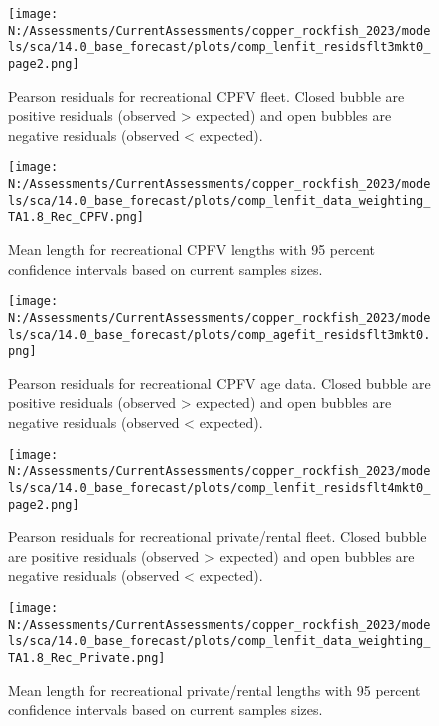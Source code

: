 \documentclass[11pt,
  english,
  letterpaper,
]{article}
\begin{document}
\pagebreak

\begin{figure}
\centering
\texttt{[image: N:/Assessments/CurrentAssessments/copper\_rockfish\_2023/models/sca/14.0\_base\_forecast/plots/comp\_lenfit\_residsflt3mkt0\_page2.png]}
\caption{Pearson residuals for recreational CPFV fleet. Closed bubble are positive residuals (observed \textgreater{} expected) and open bubbles are negative residuals (observed \textless{} expected).\label{fig:rec-cpfv-pearson}}
\end{figure}

\pagebreak

\begin{figure}
\centering
\texttt{[image: N:/Assessments/CurrentAssessments/copper\_rockfish\_2023/models/sca/14.0\_base\_forecast/plots/comp\_lenfit\_data\_weighting\_TA1.8\_Rec\_CPFV.png]}
\caption{Mean length for recreational CPFV lengths with 95 percent confidence intervals based on current samples sizes.\label{fig:rec-cpfv-mean-len-fit}}
\end{figure}

\pagebreak

\begin{figure}
\centering
\texttt{[image: N:/Assessments/CurrentAssessments/copper\_rockfish\_2023/models/sca/14.0\_base\_forecast/plots/comp\_agefit\_residsflt3mkt0.png]}
\caption{Pearson residuals for recreational CPFV age data. Closed bubble are positive residuals (observed \textgreater{} expected) and open bubbles are negative residuals (observed \textless{} expected).\label{fig:rec-cpfv-age-pearson}}
\end{figure}

\pagebreak

\begin{figure}
\centering
\texttt{[image: N:/Assessments/CurrentAssessments/copper\_rockfish\_2023/models/sca/14.0\_base\_forecast/plots/comp\_lenfit\_residsflt4mkt0\_page2.png]}
\caption{Pearson residuals for recreational private/rental fleet. Closed bubble are positive residuals (observed \textgreater{} expected) and open bubbles are negative residuals (observed \textless{} expected).\label{fig:rec-pr-pearson}}
\end{figure}

\pagebreak

\begin{figure}
\centering
\texttt{[image: N:/Assessments/CurrentAssessments/copper\_rockfish\_2023/models/sca/14.0\_base\_forecast/plots/comp\_lenfit\_data\_weighting\_TA1.8\_Rec\_Private.png]}
\caption{Mean length for recreational private/rental lengths with 95 percent confidence intervals based on current samples sizes.\label{fig:rec-pr-mean-len-fit}}
\end{figure}
\end{document}
